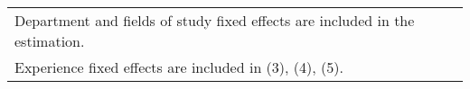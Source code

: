 \begin{table}[ht]
{\begin{tabular}{l*{5}{c}}
\multicolumn{6}{l}{\footnotesize Department and fields of study fixed effects are included in the estimation.}\\
\multicolumn{6}{l}{\footnotesize Experience fixed effects are included in (3), (4), (5).}\\
\end{tabular}%
}
\end{table}